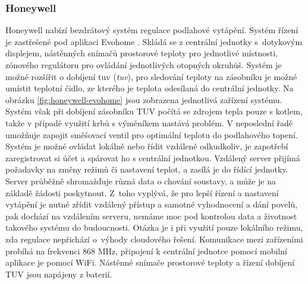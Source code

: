 \subsubsection{Honeywell}
Honeywell nabízí bezdrátový systém regulace podlahové vytápění. Systém řízení je zastřešené pod aplikaci Evohome \cite{honeywell-evohome-stranky}. Skládá se z centrální jednotky s~dotykovým displejem, nástěnných snímačů prostorové teploty pro jednotlivé místnosti, zónového regulátoru pro ovládání jednotlivých otopných okruhůš. Systém je možné rozšířit o dobíjení \acrshort{tuv} (\textit{\acrlong{tuv}}), pro sledování teploty na zásobníku je možné umístit teplotní čidlo, ze kterého je teplota odesílaná do centrální jednotky. Na obrázku \ref{fig:honeywell-evohome} jsou zobrazena jednotlivá zařízení systému. Systém však při dobíjení zásobníku TUV počítá se zdrojem tepla pouze s kotlem, takže v případě využití krbů s výměníkem nastává problém. V neposlední řadě umožňuje zapojit směšovací ventil pro optimální teplotu do podlahového topení. Systém je možné ovládat lokálně nebo řídit vzdáleně odkudkoliv, je zapotřebí zaregistrovat si účet a spárovat ho s  centrální jednotkou. Vzdálený server přijímá požadavky na změny režimů či nastavení teplot, a zasílá je do řídící jednotky. Server průběžně shromažďuje různá data o chování soustavy, a může je na základě žádosti poskytnout. Z~toho vyplývá, že pro lepší řízení a nastavení vytápění je nutné zřídit vzdálený přístup a samotné vyhodnocení a dání povelů, pak dochází na vzdálením serveru, nemáme moc pod kontrolou data a životnost takového systému do budoucnosti. Otázka je i při využití pouze lokálního režimu, zda regulace nepřichází o~výhody cloudového řešení. Komunikace mezi zařízeními probíhá na frekvenci 868 MHz, připojení k centrální jednotce pomocí mobilní aplikace je pomocí WiFi. Nástěnné snímače prostorové teploty a řízení dobíjení TUV jsou napájeny z baterií.

\newpage

